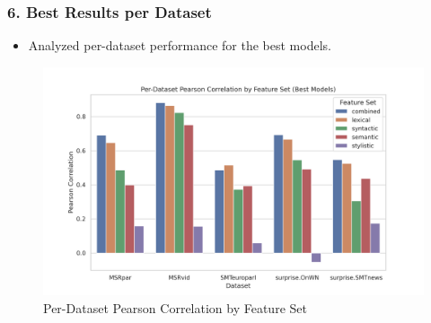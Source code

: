 \documentclass{beamer}
\begin{document}
\begin{frame}
  \frametitle{6. Best Results per Dataset}
  \begin{itemize}
    \item Analyzed per-dataset performance for the best models.
  \end{itemize}
  \vspace{0.3cm}
  \begin{figure}
    \centering
    \includegraphics[width=0.85\linewidth]{img/Per-Dataset_Pearson_Correlation_by_Feature_Set_(Best_Models).png}
    \caption{Per-Dataset Pearson Correlation by Feature Set}
  \end{figure}
\end{frame}
\end{document}
